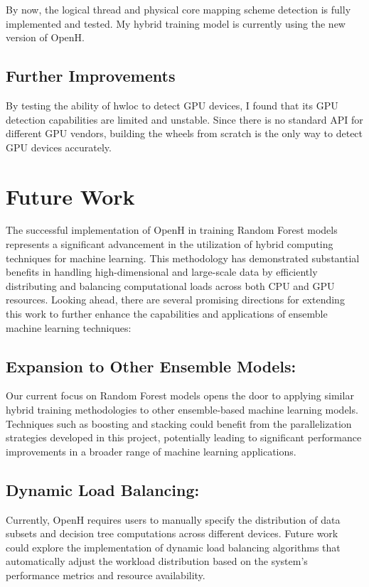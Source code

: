 \documentclass[13pt]{article}
\begin{document}
By now, the logical thread and physical core mapping scheme detection is fully implemented and tested. 
My hybrid training model is currently using the new version of OpenH.

\subsection{Further Improvements}
By testing the ability of hwloc to detect GPU devices, I found that its GPU detection capabilities are limited and unstable.
Since there is no standard API for different GPU vendors, building the wheels from scratch is the only way to detect GPU devices accurately.


\section{Future Work}
The successful implementation of OpenH in training Random Forest models represents a significant advancement in the utilization of hybrid computing techniques for machine learning. This methodology has demonstrated substantial benefits in handling high-dimensional and large-scale data by efficiently distributing and balancing computational loads across both CPU and GPU resources. Looking ahead, there are several promising directions for extending this work to further enhance the capabilities and applications of ensemble machine learning techniques:

\subsection{Expansion to Other Ensemble Models:}
Our current focus on Random Forest models opens the door to applying similar hybrid training methodologies to other ensemble-based machine learning models. 
Techniques such as boosting and stacking could benefit from the parallelization strategies developed in this project, potentially leading to significant performance improvements in a broader range of machine learning applications.

\subsection{Dynamic Load Balancing:}
Currently, OpenH requires users to manually specify the distribution of data subsets and decision tree computations across different devices. 
Future work could explore the implementation of dynamic load balancing algorithms that automatically adjust the workload distribution based on the system's performance metrics and resource availability.
\end{document}
